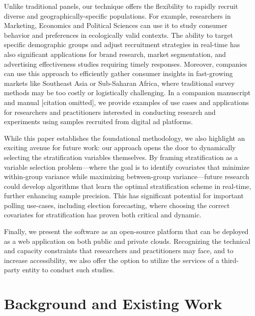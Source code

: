 \documentclass[letterpaper,12pt]{article}
\theoremstyle{proposition}
\begin{document}
Unlike traditional panels, our technique offers the flexibility to rapidly recruit diverse and geographically-specific populations. For example, researchers in Marketing, Economics and Political Sciences can use it to study consumer behavior and preferences in ecologically valid contexts. The ability to target specific demographic groups and adjust recruitment strategies in real-time has also significant applications for brand research, market segmentation, and advertising effectiveness studies requiring timely responses. Moreover, companies can use this approach to efficiently gather consumer insights in fast-growing markets like Southeast Asia or Sub-Saharan Africa, where traditional survey methods may be too costly or logistically challenging. In a companion manuscript and manual [citation omitted], we provide examples of use cases and applications for researchers and practitioners interested in conducting research and experiments using samples recruited from digital ad platforms.




While this paper establishes the foundational methodology, we also highlight an exciting avenue for future work: our approach opens the door to dynamically selecting the stratification variables themselves. By framing stratification as a variable selection problem—where the goal is to identify covariates that minimize within-group variance while maximizing between-group variance—future research could develop algorithms that learn the optimal stratification scheme in real-time, further enhancing sample precision. This has significant potential for important polling use-cases, including election forecasting, where choosing the correct covariates for stratification has proven both critical and dynamic.

Finally, we present the software as an open-source platform that can be deployed as a web application on both public and private clouds. Recognizing the technical and capacity constraints that researchers and practitioners may face, and to increase accessibility, we also offer the option to utilize the services of a third-party entity to conduct such studies. 



\section*{Background and Existing Work}
\end{document}
